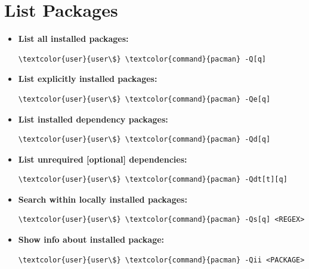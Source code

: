 \documentclass[10pt, a4paper, onecolumn, oneside, titlepage, openany]{book}
\begin{document}
\section{List Packages}
\begin{itemize}
    \item \textbf{List all installed packages:}
\begin{Verbatim}[commandchars=\\\{\}]
\textcolor{user}{user\$} \textcolor{command}{pacman} -Q[q]
\end{Verbatim}
    \item \textbf{List explicitly installed packages:}
\begin{Verbatim}[commandchars=\\\{\}]
\textcolor{user}{user\$} \textcolor{command}{pacman} -Qe[q]
\end{Verbatim}
    \item \textbf{List installed dependency packages:}
\begin{Verbatim}[commandchars=\\\{\}]
\textcolor{user}{user\$} \textcolor{command}{pacman} -Qd[q]
\end{Verbatim}
    \item \textbf{List unrequired [optional] dependencies:}
\begin{Verbatim}[commandchars=\\\{\}]
\textcolor{user}{user\$} \textcolor{command}{pacman} -Qdt[t][q]
\end{Verbatim}
    \item \textbf{Search within locally installed packages:}
\begin{Verbatim}[commandchars=\\\{\}]
\textcolor{user}{user\$} \textcolor{command}{pacman} -Qs[q] <REGEX>
\end{Verbatim}
    \item \textbf{Show info about installed package:}
\begin{Verbatim}[commandchars=\\\{\}]
\textcolor{user}{user\$} \textcolor{command}{pacman} -Qii <PACKAGE>
\end{Verbatim}
\end{itemize}
\end{document}
